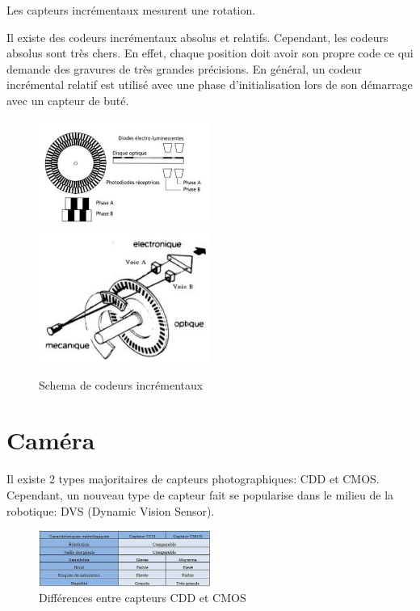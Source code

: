 \documentclass[a4paper, 11pt]{report}
\begin{document}
Les capteurs incrémentaux mesurent une rotation.

Il existe des codeurs incrémentaux absolus et relatifs. Cependant, les codeurs absolus sont très chers. En effet, chaque position doit avoir son propre code ce qui demande des gravures de très grandes précisions. En général, un codeur incrémental relatif est utilisé avec une phase d'initialisation lors de son démarrage avec un capteur de buté.

\begin{figure}[h!]
\begin{centering}
\includegraphics[width=0.5\textwidth]{images/codeurIncremental.jpg}
\includegraphics[width=0.5\textwidth]{images/schemaCodeurIncremental.jpeg}
\caption{Schema de codeurs incrémentaux}
\par\end{centering}
\end{figure}

\section{Caméra}
Il existe 2 types majoritaires de capteurs photographiques: CDD et CMOS. Cependant, un  nouveau type de capteur fait se popularise dans le milieu de la robotique: DVS (Dynamic Vision Sensor).

\begin{figure}[h!]
\begin{centering}
\includegraphics[width=0.5\textwidth]{images/differenceCDD_CMOS.png}
\caption{Différences entre capteurs CDD et CMOS}
\par\end{centering}
\end{figure}
\end{document}
